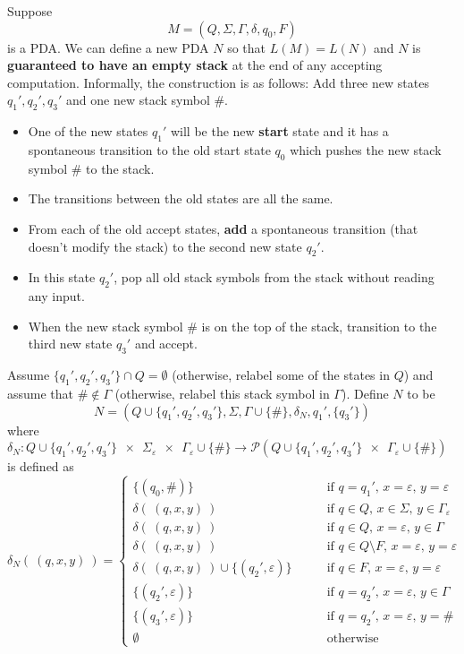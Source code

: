 \documentclass[12pt, oneside]{article}
\begin{document}
\begin{enumerate}
    Suppose 
    \[
    M = (Q, \Sigma, \Gamma, \delta, q_0, F)
    \]
    is a PDA.  We can define a new
PDA $N$ so that $L(M) = L(N)$ and $N$ is {\bf guaranteed to have an empty stack} at the 
end of any accepting computation. 
Informally, the construction is as follows: Add three new states $q_1', q_2', q_3'$ and one new
stack symbol $\#$.  
\begin{itemize}
\item One of the new states $q_1'$ will be the new {\bf start} state and it has a spontaneous transition to the old start state $q_0$ which pushes the new stack symbol $\#$ to the stack. 
\item The transitions between the old states are all the same.
\item From each of the old accept states, {\bf add} a spontaneous
transition (that doesn't modify the stack) to the second new state $q_2'$.  
\item In this state $q_2'$, pop all old stack
symbols from the stack without reading any input. 
\item When the new stack symbol $\#$ is on the top of the stack, transition to the third new state $q_3'$ and accept.
\end{itemize}
Assume $\{ q_1', q_2', q_3'\} \cap Q = \emptyset$ (otherwise, relabel 
some of the states in $Q$) and assume that $\# \notin \Gamma$ (otherwise, relabel this stack symbol 
in $\Gamma$).  Define $N$ to be
\[
N = ( Q \cup \{ q_1', q_2', q_3'\} , \Sigma, \Gamma \cup \{\#\}, \delta_N, q_1', \{q_3'\} )
\]
where 
$\delta_N : Q \cup \{ q_1', q_2', q_3'\}~~\times~~ \Sigma_\varepsilon ~~\times~~\Gamma_\varepsilon\cup \{\#\}
\to \mathcal{P}( Q \cup \{ q_1', q_2', q_3'\} ~~\times ~~\Gamma_\varepsilon\cup \{\#\})$  is defined as
\[
\delta_N ( ~(q, x, y)~) = \begin{cases}
\{ (q_0, \#) \} &\qquad \text{if $q = q_1'$, $x = \varepsilon$, $y = \varepsilon$} \\
\delta( ~(q, x, y)~)  & \qquad \text{if $q \in Q$, $x \in \Sigma$, $y \in \Gamma_\varepsilon$} \\
\delta( ~(q, x, y)~)  & \qquad \text{if $q \in Q$, $x=\varepsilon$, $y \in \Gamma$} \\
\delta( ~(q, x, y)~)  & \qquad \text{if $q \in Q  \setminus F$, $x=\varepsilon$, $y =\varepsilon$} \\
\delta( ~(q, x, y)~) \cup \{  (q_2', \varepsilon) \}  & \qquad \text{if $q \in F$, $x=\varepsilon$, $y =\varepsilon$} \\
\{ (q_2', \varepsilon)\} & \qquad \text{if $q = q_2'$, $x = \varepsilon$, $y \in  \Gamma$} \\
\{ (q_3', \varepsilon)\} & \qquad \text{if $q = q_2'$, $x = \varepsilon$, $y = \#$} \\
\emptyset & \qquad \text{otherwise}
\end{cases}
\]


\end{enumerate}
\end{document}
